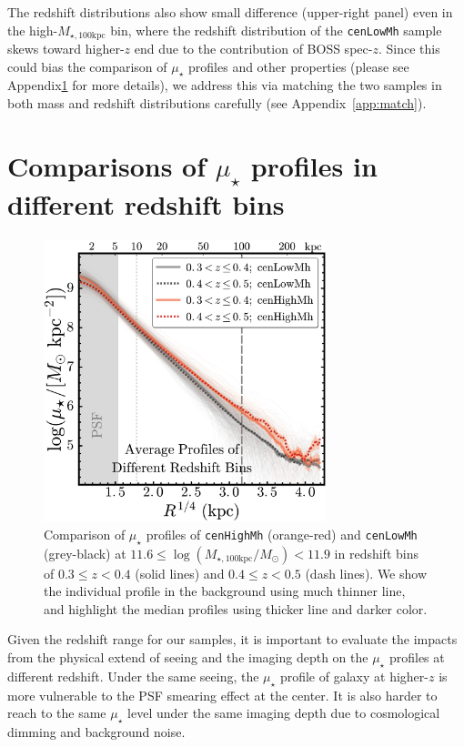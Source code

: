 \documentclass[a4paper,fleqn,usenatbib]{mnras}
\def\rbcg{\texttt{cenHighMh}}
\def\nbcg{\texttt{cenLowMh}}
\def\mtot{{$M_{\star,100\mathrm{kpc}}$}}
\def\logmtot{{$\log (M_{\star,100\mathrm{kpc}}/M_{\odot})$}}
\def\mden{{$\mu_{\star}$}}
\begin{document}
    The redshift distributions also show small difference
    (upper-right panel) even in the high-\mtot{} bin, where the redshift distribution 
    of the \nbcg{} sample skews toward higher-$z$ end due to the contribution of BOSS 
    spec-$z$.
    Since this could bias the comparison of \mden{} profiles and other properties 
    (please see Appendix\ref{app:redshift} for more details), we address this via matching 
    the two samples in both mass and redshift distributions carefully
    (see Appendix~\ref{app:match}).

\section{Comparisons of \mden{} profiles in different redshift bins}
    \label{app:redshift}
    
\begin{figure}
    \centering 
    \includegraphics[width=8.2cm]{fig/redbcg_avg_prof_z}
    \caption{
        Comparison of \mden{} profiles of \rbcg{} (orange-red) and \nbcg{} 
        (grey-black) at $11.6 \le$\logmtot$< 11.9$ in redshift bins of 
        $0.3\leq z<0.4$ (solid lines) and $0.4\leq z<0.5$ (dash lines). 
        We show the individual profile in the background using much thinner line, 
        and highlight the median profiles using thicker line and darker color.
        }
    \label{fig:avg_prof_z}
\end{figure}    

    Given the redshift range for our samples, it is important to evaluate 
    the impacts from the physical extend of seeing and the imaging depth on the \mden{} 
    profiles at different redshift. 
    Under the same seeing, the \mden{} profile of galaxy at higher-$z$ is more 
    vulnerable to the PSF smearing effect at the center. 
    It is also harder to reach to the same \mden{} level under the same imaging depth 
    due to cosmological dimming and background noise. 
    
\end{document}
